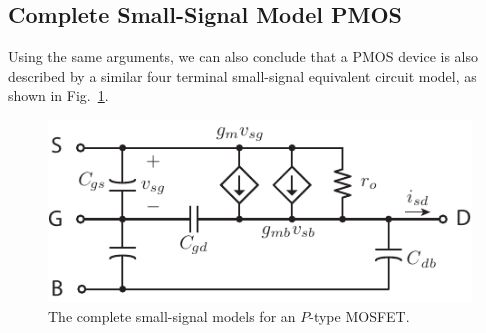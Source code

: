 \subsection{Complete Small-Signal Model PMOS}
Using the same arguments, we can also conclude that a PMOS device is also described by a similar four terminal small-signal equivalent circuit model, as shown in Fig.~\ref{fig:pmos4term_ac}.
\begin{figure}[h]
\centering
\includegraphics[scale=1]{pmos4term_ac}
\caption{The complete small-signal models for an $P$-type MOSFET.}
\label{fig:pmos4term_ac}
\end{figure}
